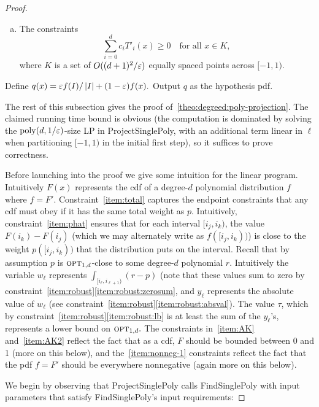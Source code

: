 \begin{proof}
\begin{algorithm}
\begin{algorithmic}[1]
\begin{enumerate}[(a)]
\item \label{item:nonneg-1} The constraints
\[
\sum_{i=0}^d c_i T'_i(x) \geq 0 \quad \text{for all~}x \in K,
\]
where $K$ is a set of $O((d+1)^2/\varepsilon)$ equally spaced points across
$[-1,1)$.

\end{enumerate}

\State\label{step:findsinglepoly:2} Define
$q(x) = { \varepsilon f(I)/\left\lvert I \right\rvert + (1-\varepsilon)f(x)}.$
Output $q$ as the hypothesis pdf.

\end{algorithmic}
\end{algorithm}



The rest of this subsection gives the proof of~\cref{theo:degreed:poly-projection}.
The claimed running time bound is obvious
 (the computation is dominated by
solving the $\operatorname*{poly}(d,1/\varepsilon)$-size LP in {\sc ProjectSinglePoly}, with an additional term linear in $\ell$ when partitioning $[-1,1)$ in the initial first step),
so it suffices to prove correctness.

Before launching into the proof we give some intuition for the linear
program.
Intuitively $F(x)$ represents the cdf of a degree-$d$ polynomial
distribution $f$ where $f=F'.$  Constraint~\ref{item:total} captures the endpoint
constraints that any cdf must obey {if it has the same total weight as $p$}.
Intuitively, constraint~\ref{item:phat} ensures that for each interval $[i_j,i_k)$,
the value $F(i_k)-F(i_j)$ (which we may alternately write as
$f([i_j,i_k))$) is close to the weight 
$p([i_j,i_k))$ that the distribution 
puts on the interval.  
Recall that by assumption
$p$ is ${\textsc{opt}}_{1,d}$-close to some degree-$d$ polynomial $r$.
Intuitively the variable $w_\ell$ represents $\int_{[i_\ell, i_{\ell+1})}
(r-p)$ (note that these values sum to zero by
constraint~\ref{item:robust}\eqref{item:robust:zerosum}, and $y_\ell$ represents the absolute value of $w_\ell$
(see constraint~\ref{item:robust}\eqref{item:robust:absval}).
The value $\tau$, which by constraint~\ref{item:robust}\eqref{item:robust:lb} is at least the 
sum of the $y_\ell$'s, represents a lower bound on 
${\textsc{opt}}_{1,d}.$
The constraints in~\ref{item:AK} and~\ref{item:AK2} reflect the fact that
as a cdf, $F$ should be bounded between 0 and 1 (more on this below),
and the~\ref{item:nonneg-1} constraints reflect the fact that the pdf $f=F'$ should be
everywhere nonnegative (again more on this below).

\medskip

We begin by observing that 
{\sc ProjectSinglePoly} calls {\sc FindSinglePoly} with input parameters that satisfy
{\sc FindSinglePoly}'s input requirements:


\end{proof}
